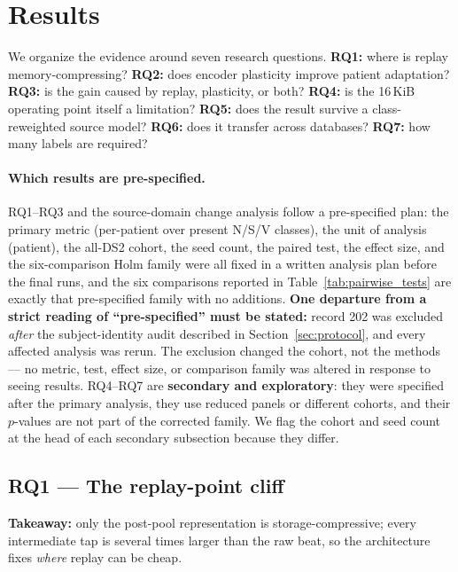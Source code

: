 \section{Results}
\label{sec:results}

We organize the evidence around seven research questions.
\textbf{RQ1:} where is replay memory-compressing? \textbf{RQ2:} does encoder
plasticity improve patient adaptation? \textbf{RQ3:} is the gain caused by
replay, plasticity, or both? \textbf{RQ4:} is the 16\,KiB operating point itself
a limitation? \textbf{RQ5:} does the result survive a class-reweighted
source model? \textbf{RQ6:} does it transfer across databases? \textbf{RQ7:} how
many labels are required?

\paragraph{Which results are pre-specified.} RQ1--RQ3 and the source-domain
change analysis follow a pre-specified plan: the primary metric (per-patient
\macrof{} over present N/S/V classes), the unit of analysis (patient), the
all-DS2 cohort, the seed count, the paired test, the effect size, and the
six-comparison Holm family were all fixed in a written analysis plan before the
final runs, and the six comparisons reported in Table~\ref{tab:pairwise_tests}
are exactly that pre-specified family with no additions. \textbf{One departure
from a strict reading of ``pre-specified'' must be stated:} record 202 was
excluded \emph{after} the subject-identity audit described in
Section~\ref{sec:protocol}, and every affected analysis was rerun. The exclusion
changed the cohort, not the methods --- no metric, test, effect size, or
comparison family was altered in response to seeing results. RQ4--RQ7 are \textbf{secondary and exploratory}: they were specified
after the primary analysis, they use reduced panels or different cohorts, and
their $p$-values are not part of the corrected family. We flag the cohort and
seed count at the head of each secondary subsection because they differ.

\subsection{RQ1 --- The replay-point cliff}

\textbf{Takeaway:} only the post-pool representation is storage-compressive;
every intermediate tap is several times larger than the raw beat, so the
architecture fixes \emph{where} replay can be cheap.

